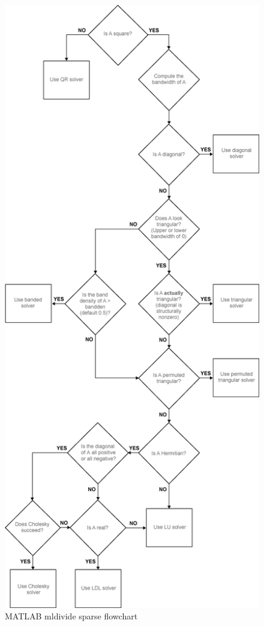 \documentclass[12pt,letterpaper,reqno]{amsart}
\begin{document}
\begin{enumerate}
\begin{flushleft}
\begin{enumerate}
\begin{flushleft}
    \begin{figure}[h]
        \includegraphics[scale = 0.4]{mldivide_sparse.png}
        \caption{MATLAB mldivide sparse flowchart}
    \end{figure}


\end{flushleft}
\end{enumerate}
\end{flushleft}
\end{enumerate}
\end{document}
